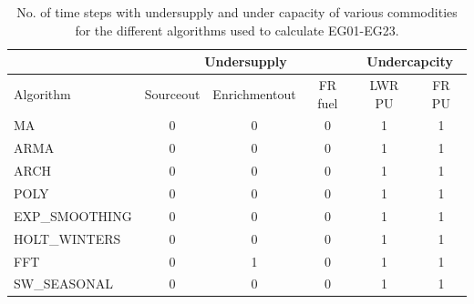 \documentclass[11pt,letterpaper]{article}
\begin{document}
\begin{table}[]
	\centering
	\caption {No. of time steps with undersupply and under capacity of various commodities for the different algorithms used to calculate EG01-EG23.}
	\label{tab:23-commod}
	\begin{tabular}{|l|c|c|c|c|c|}
		\hline
		& \multicolumn{3}{c|}{Undersupply} & \multicolumn{2}{c|}{Undercapcity} \\ \hline
		Algorithm & Sourceout & Enrichmentout & FR fuel & LWR PU & FR PU \\ \hline
		MA        & 0 & 0 & 0 & 1 & 1 \\ \hline
		ARMA      & 0 & 0 & 0 & 1 & 1 \\ \hline
		ARCH      & 0 & 0 & 0 & 1 & 1 \\ \hline
		POLY      & 0 & 0 & 0 & 1 & 1 \\ \hline
		EXP\_SMOOTHING & 0 & 0 & 0 & 1 & 1 \\ \hline
		HOLT\_WINTERS  & 0 & 0 & 0 & 1 & 1 \\ \hline
		FFT       & 0 & 1 & 0 & 1 & 1 \\ \hline
		SW\_SEASONAL  & 0 & 0 & 0 & 1 & 1 \\ \hline
	\end{tabular}
\end{table}
\end{document}
